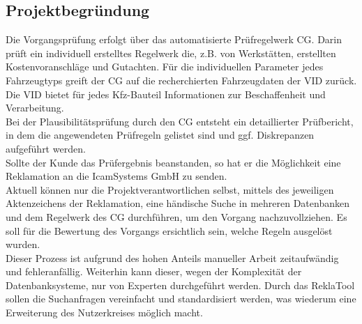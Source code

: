 \subsection{Projektbegründung} 
\label{sec:Projektbegruendung}
Die Vorgangsprüfung erfolgt über das automatisierte Prüfregelwerk \ac{CG}.
Darin prüft ein individuell erstelltes Regelwerk die, z.B. von Werkstätten, erstellten
Kostenvoranschläge und Gutachten. Für die individuellen Parameter jedes Fahrzeugtyps greift
der \acs{CG} auf die recherchierten Fahrzeugdaten der \ac{VID} zurück. 
Die \acs{VID} bietet für jedes Kfz-Bauteil Informationen zur Beschaffenheit und Verarbeitung.\\
Bei der Plausibilitätsprüfung durch den \acs{CG} entsteht ein detaillierter Prüfbericht, in dem die
angewendeten Prüfregeln gelistet sind und ggf. Diskrepanzen aufgeführt werden.\\
Sollte der Kunde das Prüfergebnis beanstanden, so hat er die Möglichkeit eine Reklamation an
die IcamSystems GmbH zu senden.\\
Aktuell können nur die Projektverantwortlichen selbst, mittels des jeweiligen Aktenzeichens der
Reklamation, eine händische Suche in mehreren Datenbanken und dem Regelwerk des \acs{CG}
durchführen, um den Vorgang nachzuvollziehen. Es soll für die Bewertung des Vorgangs
ersichtlich sein, welche Regeln ausgelöst wurden.\\
Dieser Prozess ist aufgrund des hohen Anteils manueller Arbeit zeitaufwändig und fehleranfällig.
Weiterhin kann dieser, wegen der Komplexität der Datenbanksysteme, nur von Experten durchgeführt werden.
Durch das ReklaTool sollen die Suchanfragen vereinfacht und standardisiert werden, was wiederum 
eine Erweiterung des Nutzerkreises möglich macht.

